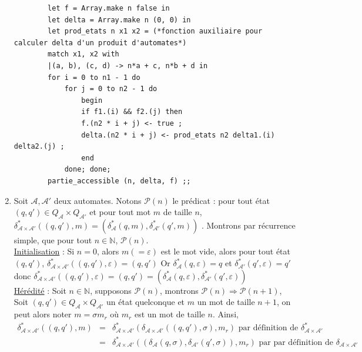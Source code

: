\documentclass{article}
\newcommand{\bb}[1]{\mathbb{#1}}
\begin{document}
\begin{enumerate}
\begin{verbatim}
        let f = Array.make n false in
        let delta = Array.make n (0, 0) in
        let prod_etats n x1 x2 = (*fonction auxiliaire pour calculer delta d'un produit d'automates*)
        match x1, x2 with
        |(a, b), (c, d) -> n*a + c, n*b + d in
        for i = 0 to n1 - 1 do
            for j = 0 to n2 - 1 do
                begin
                if f1.(i) && f2.(j) then
                f.(n2 * i + j) <- true ;
                delta.(n2 * i + j) <- prod_etats n2 delta1.(i) delta2.(j) ;
                end
            done; done;
        partie_accessible (n, delta, f) ;;
    \end{verbatim}
    \item \label{itm:rec2} Soit $\mathcal{A}, \mathcal{A}'$ deux automates. \sloppy \newline
    Notons $\mathcal{P}(n)$ le prédicat : \og pour tout état $(q, q') \in Q_\mathcal{A} \times Q_{\mathcal{A}'}$ et pour tout mot $m$ de taille $n$, $\delta_{\mathcal{A} \times \mathcal{A}'}^*((q, q'), m) = (\delta_\mathcal{A}^*(q, m),\delta_{\mathcal{A}'}^*(q', m))$ \fg. Montrons par récurrence simple, que pour tout $n \in \bb{N}$, $\mathcal{P}(n)$. \\[2mm] 
    \underline{Initialisation} : Si $n = 0$, alors $m (= \varepsilon)$ est le mot vide, alors pour tout état $(q, q')$, $\delta_{\mathcal{A} \times \mathcal{A}'}^*((q, q'), \varepsilon) = (q, q')$ \newline 
    Or $\delta_\mathcal{A}^*(q, \varepsilon) = q$ et $\delta_{\mathcal{A}'}^*(q', \varepsilon) = q'$ donc $\delta_{\mathcal{A} \times \mathcal{A}'}^*((q, q'), \varepsilon) = (q, q') = (\delta_\mathcal{A}^*(q, \varepsilon), \delta_{\mathcal{A}'}^*(q', \varepsilon))$ \\[2mm]
    \underline{Hérédité} : Soit $n \in \bb{N}$, supposons $\mathcal{P}(n)$, montrons $\mathcal{P}(n) \Rightarrow \mathcal{P}(n + 1)$, \newline
    Soit $(q, q') \in Q_\mathcal{A} \times Q_{\mathcal{A}'}$ un état quelconque et $m$ un mot de taille $n + 1$, on peut alors noter $m = \sigma m_r$ où $m_r$ est un mot de taille $n$. Ainsi, \begin{eqnarray*}
        \delta_{\mathcal{A} \times \mathcal{A}'}^*((q, q'), m) & = & \delta_{\mathcal{A} \times \mathcal{A}'}^*(\delta_{\mathcal{A} \times \mathcal{A}'}((q, q'), \sigma), m_r) \text{ par définition de } \delta_{\mathcal{A} \times \mathcal{A}'}^* \\
        & = & \delta_{\mathcal{A} \times \mathcal{A}'}^*((\delta_\mathcal{A}(q, \sigma),\delta_{\mathcal{A}'}(q', \sigma)), m_r) \text{ par par définition de } \delta_{\mathcal{A} \times \mathcal{A}'} \\

\end{eqnarray*}
\end{enumerate}
\end{document}
